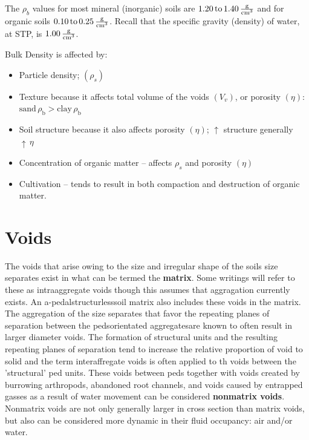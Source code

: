\documentclass[a5paper]{report}
\begin{document}
The $\rho_b$ values for most mineral (inorganic) soils are $\ce{1.20 to 1.40 \frac{g}{cm^3}}$ and for organic soils $\ce{0.10 to 0.25 \frac{g}{cm^3}}$. Recall that the specific gravity (density) of water, at STP, is $\ce{1.00 \frac{g}{cm^3}}$.

Bulk Density is affected by:
\begin{itemize}
    \item Particle density; $\left(\rho_s\right)$
    \item Texture because it affects total volume of the voids $\left(V_v\right)$, or porosity $\left(\eta\right)$:  $\text{sand}\,\rho_{\text{b}} > \text{clay}\,\rho_{\text{b}}$
    \item Soil structure because it also affects porosity $\left(\eta\right)$; $\uparrow$  structure generally $\uparrow\,\eta$
    \item Concentration of organic matter – affects $\rho_s$ and porosity $\left(\eta\right)$
    \item Cultivation – tends to result in both compaction and destruction of organic matter.
\end{itemize}

\section{Voids}
\label{voids}

The voids that arise owing to the size and irregular shape of the soils size separates exist in what can be termed the \textbf{matrix}. Some writings will refer to these as intraaggregate voids though this assumes that aggragation currently exists. An a-pedal\textemdash{}structurless\textemdash{}soil matrix also includes these voids in the matrix. The aggregation of the size separates that favor the repeating planes of separation between the peds\textemdash{}orientated aggregates\textemdash{}are known to often result in larger diameter voids. The formation of structural units and the resulting repeating planes of separation tend to increase the relative proportion of void to solid and the term interaffregate voids is often applied to th voids between the 'structural' ped units. These voids between peds together with voids created by burrowing arthropods, abandoned root channels, and voids caused by entrapped gasses as a result of water movement can be considered \textbf{nonmatrix voids}. Nonmatrix voids are not only generally larger in cross section than matrix voids, but also can be considered more dynamic in their fluid occupancy: air and/or water.  
\end{document}
